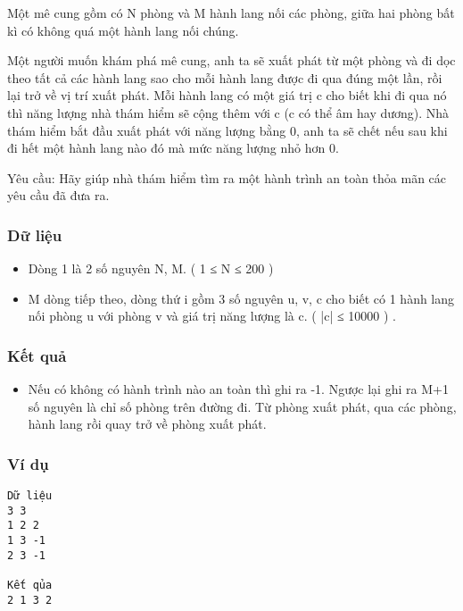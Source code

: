 

Một mê cung gồm có N phòng và M hành lang nối các phòng, giữa hai phòng bất kì có không quá một hành lang nối chúng.

Một người muốn khám phá mê cung, anh ta sẽ xuất phát từ một phòng và đi dọc theo tất cả các hành lang sao cho mỗi hành lang được đi qua đúng một lần, rồi lại trở về vị trí xuất phát. Mỗi hành lang có một giá trị c cho biết khi đi qua nó thì năng lượng nhà thám hiểm sẽ cộng thêm với c (c có thể âm hay dương). Nhà thám hiểm bắt đầu xuất phát với năng lượng bằng 0, anh ta sẽ chết nếu sau khi đi hết một hành lang nào đó mà mức năng lượng nhỏ hơn 0.


Yêu cầu: Hãy giúp nhà thám hiểm tìm ra một hành trình an toàn thỏa mãn các yêu cầu đã đưa ra.

\subsubsection{Dữ liệu}
\begin{itemize}
	\item Dòng 1 là 2 số nguyên N, M. ( 1 ≤ N ≤ 200 )
	\item M dòng tiếp theo, dòng thứ i gồm 3 số nguyên u, v, c cho biết có 1 hành lang nối phòng u với phòng v và giá trị năng lượng là c. ( |c| ≤ 10000 ) .
\end{itemize}

\subsubsection{Kết quả}
\begin{itemize}
	\item Nếu có không có hành trình nào an toàn thì ghi ra -1. Ngược lại ghi ra M+1 số nguyên là chỉ số phòng trên đường đi. Từ phòng xuất phát, qua các phòng, hành lang rồi quay trở về phòng xuất phát.
\end{itemize}

\subsubsection{Ví dụ}
\begin{verbatim}
Dữ liệu
3 3
1 2 2
1 3 -1
2 3 -1

Kết qủa
2 1 3 2
\end{verbatim}
